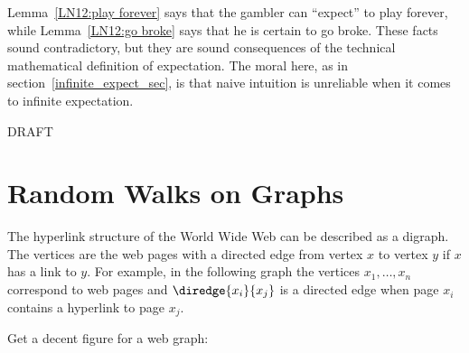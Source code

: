 Lemma~\ref{LN12:play forever} says that the gambler can ``expect'' to
play forever, while Lemma~\ref{LN12:go broke} says that he is certain
to go broke.  These facts sound contradictory, but they are sound
consequences of the technical mathematical definition of expectation.
The moral here, as in section~\ref{infinite_expect_sec}, is that naive
intuition is unreliable when it comes to infinite expectation.


\begin{problems}
\practiceproblems
{}

\classproblems
{}

\begin{editingnotes}
\homeworkproblems
DRAFT
\end{editingnotes}

\end{problems}


\section{Random Walks on Graphs}\label{Google_sec}

\begin{editingnotes}


\end{editingnotes}

The hyperlink structure of the World Wide Web can be described as a
digraph.  The vertices are the web pages with a directed edge from vertex
$x$ to vertex $y$ if $x$ has a link to $y$.  For example, in the following
graph the vertices $x_1, \ldots, x_n$ correspond to web pages and
$\diredge{x_i}{x_j}$ is a directed edge when page $x_i$ contains a
hyperlink to page $x_j$.

\begin{editingnotes}
Get a decent figure for a web graph:
\end{editingnotes}

